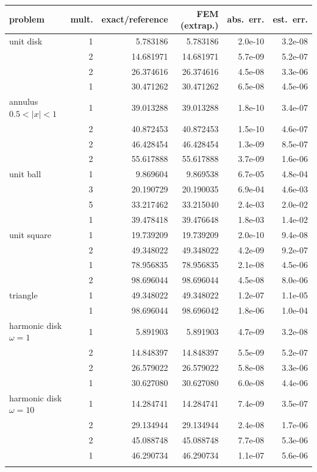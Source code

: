 \begin{tabular}{lrrrrr}
\toprule
problem & mult. & exact/reference & FEM (extrap.) & abs.\ err. & est.\ err. \\
\midrule
unit disk & 1 & 5.783186 & 5.783186 & 2.0e-10 & 3.2e-08 \\
 & 2 & 14.681971 & 14.681971 & 5.7e-09 & 5.2e-07 \\
 & 2 & 26.374616 & 26.374616 & 4.5e-08 & 3.3e-06 \\
 & 1 & 30.471262 & 30.471262 & 6.5e-08 & 4.5e-06 \\
\addlinespace
annulus $0.5<|x|<1$ & 1 & 39.013288 & 39.013288 & 1.8e-10 & 3.4e-07 \\
 & 2 & 40.872453 & 40.872453 & 1.5e-10 & 4.6e-07 \\
 & 2 & 46.428454 & 46.428454 & 1.3e-09 & 8.5e-07 \\
 & 2 & 55.617888 & 55.617888 & 3.7e-09 & 1.6e-06 \\
\addlinespace
unit ball & 1 & 9.869604 & 9.869538 & 6.7e-05 & 4.8e-04 \\
 & 3 & 20.190729 & 20.190035 & 6.9e-04 & 4.6e-03 \\
 & 5 & 33.217462 & 33.215040 & 2.4e-03 & 2.0e-02 \\
 & 1 & 39.478418 & 39.476648 & 1.8e-03 & 1.4e-02 \\
\addlinespace
unit square & 1 & 19.739209 & 19.739209 & 2.0e-10 & 9.4e-08 \\
 & 2 & 49.348022 & 49.348022 & 4.2e-09 & 9.2e-07 \\
 & 1 & 78.956835 & 78.956835 & 2.1e-08 & 4.5e-06 \\
 & 2 & 98.696044 & 98.696044 & 4.5e-08 & 8.0e-06 \\
\addlinespace
triangle & 1 & 49.348022 & 49.348022 & 1.2e-07 & 1.1e-05 \\
 & 1 & 98.696044 & 98.696042 & 1.8e-06 & 1.0e-04 \\
\addlinespace
harmonic disk $\omega=1$ & 1 & 5.891903 & 5.891903 & 4.7e-09 & 3.2e-08 \\
 & 2 & 14.848397 & 14.848397 & 5.5e-09 & 5.2e-07 \\
 & 2 & 26.579022 & 26.579022 & 5.8e-08 & 3.3e-06 \\
 & 1 & 30.627080 & 30.627080 & 6.0e-08 & 4.4e-06 \\
\addlinespace
harmonic disk $\omega=10$ & 1 & 14.284741 & 14.284741 & 7.4e-09 & 3.5e-07 \\
 & 2 & 29.134944 & 29.134944 & 2.4e-08 & 1.7e-06 \\
 & 2 & 45.088748 & 45.088748 & 7.7e-08 & 5.3e-06 \\
 & 1 & 46.290734 & 46.290734 & 1.1e-07 & 5.6e-06 \\
\addlinespace
\bottomrule
\end{tabular}


